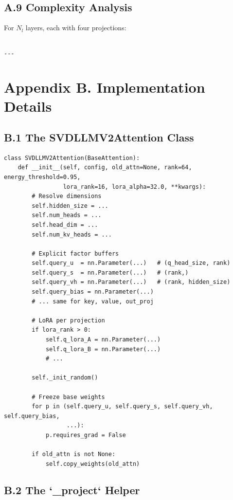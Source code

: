 \subsection{A.9 Complexity Analysis}

For $N_l$ layers, each with four projections:

\begin{lstlisting}

---
\end{lstlisting}


\section{Appendix B. Implementation Details}

\subsection{B.1 The SVDLLMV2Attention Class}

\begin{lstlisting}
class SVDLLMV2Attention(BaseAttention):
    def __init__(self, config, old_attn=None, rank=64, energy_threshold=0.95,
                 lora_rank=16, lora_alpha=32.0, **kwargs):
        # Resolve dimensions
        self.hidden_size = ...
        self.num_heads = ...
        self.head_dim = ...
        self.num_kv_heads = ...
        
        # Explicit factor buffers
        self.query_u  = nn.Parameter(...)   # (q_head_size, rank)
        self.query_s  = nn.Parameter(...)   # (rank,)
        self.query_vh = nn.Parameter(...)   # (rank, hidden_size)
        self.query_bias = nn.Parameter(...)
        # ... same for key, value, out_proj
        
        # LoRA per projection
        if lora_rank > 0:
            self.q_lora_A = nn.Parameter(...)
            self.q_lora_B = nn.Parameter(...)
            # ...
        
        self._init_random()
        
        # Freeze base weights
        for p in (self.query_u, self.query_s, self.query_vh, self.query_bias,
                  ...):
            p.requires_grad = False
        
        if old_attn is not None:
            self.copy_weights(old_attn)
\end{lstlisting}

\subsection{B.2 The `\_project` Helper}

